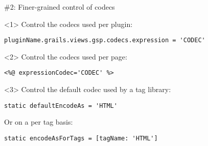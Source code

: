 \begin{frame}

    \begin{center}
      \Huge\color{green} \#2: Finer-grained control of codecs
    \end{center}

    \vspace{1cm}

    \begin{onlyenv}<1>
      Control the codecs used per plugin:
      \begin{center}
        \begin{minipage}{\textwidth}
          \begin{verbatim}
pluginName.grails.views.gsp.codecs.expression = 'CODEC'
          \end{verbatim}
        \end{minipage}
      \end{center}
    \end{onlyenv}

    \begin{onlyenv}<2>
      Control the codecs used per page:
      \begin{center}
        \begin{minipage}{\textwidth}
          \begin{verbatim}
<%@ expressionCodec='CODEC' %>
          \end{verbatim}
        \end{minipage}
      \end{center}
    \end{onlyenv}

    \begin{onlyenv}<3>
      Control the default codec used by a tag library:
      \begin{center}
        \begin{minipage}{\textwidth}
          \begin{verbatim}
static defaultEncodeAs = 'HTML'
          \end{verbatim}
        \end{minipage}
      \end{center}

      Or on a per tag basis:
      \begin{center}
        \begin{minipage}{\textwidth}
          \begin{verbatim}
static encodeAsForTags = [tagName: 'HTML']
          \end{verbatim}
        \end{minipage}
      \end{center}
    \end{onlyenv}


\end{frame}
